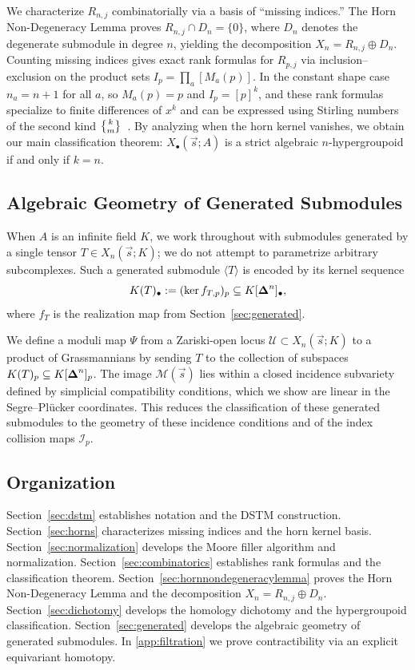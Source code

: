 We characterize $R_{n,j}$ combinatorially via a basis of ``missing indices.''
The Horn Non-Degeneracy Lemma proves $R_{n,j}\cap D_n=\{0\}$, where $D_n$ denotes the degenerate submodule in degree $n$,
yielding the decomposition $X_n = R_{n,j} \oplus D_n$.
Counting missing indices gives exact rank formulas for $R_{p,j}$ via inclusion--exclusion on the product sets
$I_p = \prod_a [M_a(p)]$.
In the constant shape case $n_a=n+1$ for all $a$, so $M_a(p)=p$ and $I_p=[p]^k$, and these rank formulas
specialize to finite differences of $x^k$ and can be expressed using Stirling numbers of the second kind
$\StirlingII{k}{m}$~\cite{StanleyEC1}.
By analyzing when the horn kernel vanishes, we obtain our main classification theorem:
$X_\bullet(\vec{s};A)$ is a strict algebraic $n$-hypergroupoid if and only if $k=n$.


\subsection*{Algebraic Geometry of Generated Submodules}
When $A$ is an infinite field $K$, we work throughout with submodules generated by a single tensor $T\in X_n(\vec{s};K)$;
we do not attempt to parametrize arbitrary subcomplexes. Such a generated submodule $\langle T \rangle$ is
encoded by its kernel sequence
\[
K(T)_\bullet := (\ker f_{T,p})_p \subseteq K[\boldsymbol{\Delta}^n]_\bullet,
\]
where $f_T$ is the realization map from Section~\ref{sec:generated}.

We define a moduli map $\Psi$ from a Zariski-open locus $\mathcal{U} \subset X_n(\vec{s};K)$
to a product of Grassmannians by sending $T$ to the collection of subspaces $K(T)_p \subseteq K[\boldsymbol{\Delta}^n]_p$.
The image $\mathcal{M}(\vec{s})$ lies within a closed incidence subvariety defined by simplicial compatibility
conditions, which we show are linear in the Segre--Pl\"ucker coordinates.
This reduces the classification of these generated submodules to the geometry of these incidence conditions
and of the index collision maps $\mathcal{I}_p$.




\subsection*{Organization}

Section~\ref{sec:dstm} establishes notation and the DSTM construction.
Section~\ref{sec:horns} characterizes missing indices and the horn kernel basis.
Section~\ref{sec:normalization} develops the Moore filler algorithm and normalization.
Section~\ref{sec:combinatorics} establishes rank formulas and the classification theorem.
Section~\ref{sec:hornnondegeneracylemma} proves the Horn Non-Degeneracy Lemma and the
decomposition $X_n = R_{n,j} \oplus D_n$.
Section~\ref{sec:dichotomy} develops the homology dichotomy and the hypergroupoid classification.
Section~\ref{sec:generated} develops the algebraic geometry of generated submodules.
In \ref{app:filtration} we prove contractibility via an explicit equivariant homotopy.


